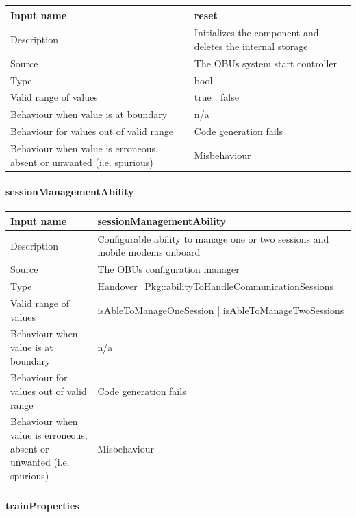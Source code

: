 \begin{longtable}{p{}p{}}
	\toprule
	Input name				& reset \\
	\midrule
	Description				& Initializes the component and deletes the internal storage \\
	\midrule
	Source					& The OBUs system start controller \\ 
	\midrule
	Type					& bool \\
	\midrule
	Valid range of values	& true | false \\
	\midrule
	Behaviour when value is at boundary	& n/a \\
	\midrule
	Behaviour for values out of valid range	& Code generation fails \\
	\midrule
	Behaviour when value is erroneous, absent or unwanted (i.e. spurious) & Misbehaviour \\
	\bottomrule
\end{longtable}

\paragraph{sessionManagementAbility}

\begin{longtable}{p{}p{}}
	\toprule
	Input name				& sessionManagementAbility \\
	\midrule
	Description				& Configurable ability to manage one or two sessions and mobile modems onboard \\
	\midrule
	Source					& The OBUs configuration manager \\ 
	\midrule
	Type					& Handover\_Pkg::abilityToHandleCommunicationSessions \\
	\midrule
	Valid range of values	& isAbleToManageOneSession | isAbleToManageTwoSessions \\
	\midrule
	Behaviour when value is at boundary	& n/a \\
	\midrule
	Behaviour for values out of valid range	& Code generation fails \\
	\midrule
	Behaviour when value is erroneous, absent or unwanted (i.e. spurious) & Misbehaviour \\
	\bottomrule
\end{longtable}

\paragraph{trainProperties}


